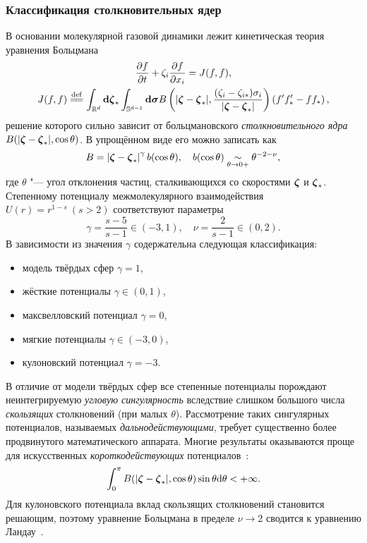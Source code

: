 \subsubsection{Классификация столкновительных ядер}

В основании молекулярной газовой динамики лежит кинетическая теория уравнения Больцмана
\begin{gather*}
    \pder[f]{t} + \zeta_i\pder[f]{x_i} = J(f,f), \\
    J(f,f) \eqdef \int_{\mathbb{R}^d}\dzeta_*\int_{\mathbb{S}^{d-1}}\boldsymbol{\dd\sigma}
    B\left(|\bzeta - \bzeta_*|, \frac{(\zeta_i - \zeta_{i*})\sigma_i}{|\bzeta - \bzeta_*|}\right) \left(f'f'_* - ff_*\right),
\end{gather*}
решение которого сильно зависит от больцмановского \emph{столкновительного ядра} \(B(|{\boldsymbol{\zeta}} - {\boldsymbol{\zeta}}_*|, \cos\theta)\).
В упрощённом виде его можно записать как
\begin{equation*}
    B = \left|{\boldsymbol{\zeta}} - {\boldsymbol{\zeta}}_*\right|^\gamma b(\cos\theta), \quad b(\cos\theta) \underset{\theta\to0+}{\sim} \theta^{-2-\nu},
\end{equation*}
где \(\theta\) "--- угол отклонения частиц, сталкивающихся со скоростями \({\boldsymbol{\zeta}}\) и \({\boldsymbol{\zeta}}_*\).
Степенному потенциалу межмолекулярного взаимодействия \( U(r)=r^{1-s}\:(s>2) \) соответствуют параметры
\begin{equation*}
    \gamma = \frac{s-5}{s-1}\in(-3,1), \quad \nu = \frac{2}{s-1}\in(0,2).
\end{equation*}
В зависимости из значения \(\gamma\) содержательна следующая классификация:
\begin{itemize}\label{eq:power_classification}
    \item модель твёрдых сфер \(\gamma=1\),
    \item жёсткие потенциалы \(\gamma\in(0,1)\),
    \item максвелловский потенциал \(\gamma=0\),
    \item мягкие потенциалы \(\gamma\in(-3,0)\),
    \item кулоновский потенциал \(\gamma=-3\).
\end{itemize}
В отличие от модели твёрдых сфер все степенные потенциалы порождают неинтегрируемую \emph{угловую сингулярность}
вследствие слишком большого числа \emph{скользящих} столкновений (при малых \(\theta\)).
Рассмотрение таких сингулярных потенциалов, называемых \emph{дальнодействующими},
требует существенно более продвинутого математического аппарата.
Многие результаты оказываются проще для искусственных \emph{короткодействующих} потенциалов~\cite{Grad1970}:
\begin{equation*}\label{eq:angular_cutoff}
    \int_0^\pi B(|{\boldsymbol{\zeta}} - {\boldsymbol{\zeta}}_*|, \cos\theta)\sin\theta\mathrm{d}\theta < +\infty.
\end{equation*}
Для кулоновского потенциала вклад скользящих столкновений становится решающим,
поэтому уравнение Больцмана в пределе \(\nu\to2\) сводится к уравнению Ландау~\cite{Arseniev1990}.

